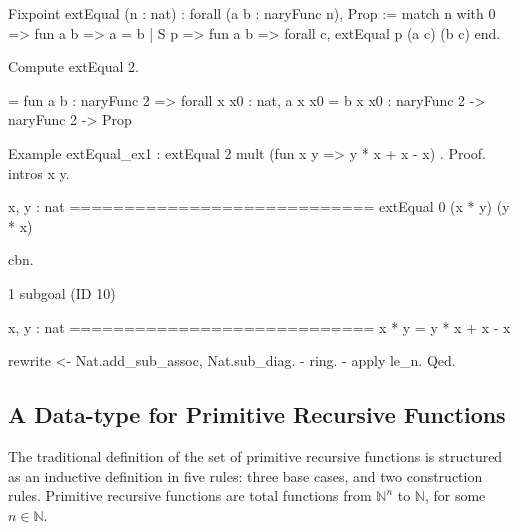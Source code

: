 
\begin{Coqsrc}
Fixpoint  extEqual (n : nat) : forall  (a b : naryFunc n), Prop :=
  match n with
    0 => fun a b => a = b
  | S p => fun a b => forall c, extEqual p (a c) (b c)
  end.
\end{Coqsrc}

\begin{Coqsrc}
Compute extEqual 2.
\end{Coqsrc}

\begin{Coqanswer}
     = fun a b : naryFunc 2 => forall x x0 : nat, a x x0 = b x x0
     : naryFunc 2 -> naryFunc 2 -> Prop
 \end{Coqanswer}
 
\begin{Coqsrc}
Example extEqual_ex1 : extEqual 2 mult (fun x y =>  y * x + x - x) .
Proof.
  intros x y.
\end{Coqsrc}

\begin{Coqanswer}
  x, y : nat
  ============================
  extEqual 0 (x * y) (y * x)
\end{Coqanswer}

\begin{Coqsrc}
  cbn.
\end{Coqsrc}

\begin{Coqanswer}
1 subgoal (ID 10)
  
  x, y : nat
  ============================
  x * y = y * x + x - x
\end{Coqanswer}

\begin{Coqsrc}
  rewrite <- Nat.add_sub_assoc, Nat.sub_diag.
  - ring.
  - apply le_n.  
Qed.
\end{Coqsrc}

\subsection{A Data-type for Primitive Recursive Functions}

The traditional definition of the set of primitive recursive functions is structured as an inductive definition 
in five rules: three base cases, and two construction rules. Primitive recursive functions are total functions from $\mathbb{N}^n$ to
$\mathbb{N}$, for some $n\in\mathbb{N}$.

